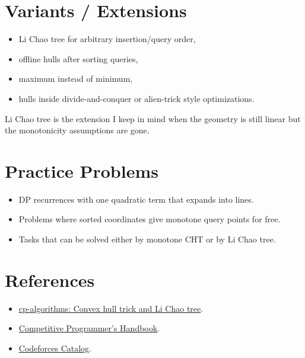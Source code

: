 \section*{Variants / Extensions}

\begin{itemize}
  \item Li Chao tree for arbitrary insertion/query order,
  \item offline hulls after sorting queries,
  \item maximum instead of minimum,
  \item hulls inside divide-and-conquer or alien-trick style optimizations.
\end{itemize}

Li Chao tree is the extension I keep in mind when the geometry is still linear but the monotonicity assumptions are
gone.

\section*{Practice Problems}

\begin{itemize}
  \item DP recurrences with one quadratic term that expands into lines.
  \item Problems where sorted coordinates give monotone query points for free.
  \item Tasks that can be solved either by monotone CHT or by Li Chao tree.
\end{itemize}

\section*{References}

\begin{itemize}
  \item \href{https://cp-algorithms.com/geometry/convex_hull_trick.html}{cp-algorithms: Convex hull trick and Li Chao tree}.
  \item \href{https://usaco.guide/CPH.pdf}{Competitive Programmer's Handbook}.
  \item \href{https://codeforces.com/catalog}{Codeforces Catalog}.
\end{itemize}
